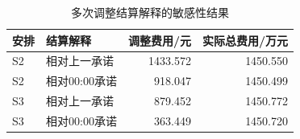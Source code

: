 \begin{table}[H]
\centering\small
\caption{多次调整结算解释的敏感性结果}
\label{tab:q3-settlement-sensitivity}
\begin{tabular}{llrr}
\toprule
安排 & 结算解释 & 调整费用/元 & 实际总费用/万元 \\
\midrule
S2 & 相对上一承诺 & 1433.572 & 1450.550 \\
S2 & 相对00:00承诺 & 918.047 & 1450.499 \\
S3 & 相对上一承诺 & 879.452 & 1450.772 \\
S3 & 相对00:00承诺 & 363.449 & 1450.720 \\
\bottomrule
\end{tabular}
\end{table}
